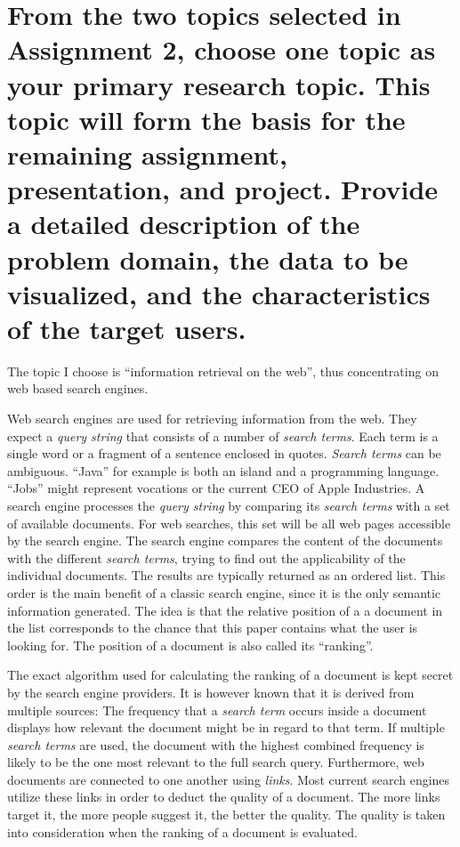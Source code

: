 \section{From the two topics selected in Assignment 2, choose one topic as your primary research topic. This topic will form the basis for the remaining assignment, presentation, and project. Provide a detailed description of the problem domain, the data to be visualized, and the characteristics of the target users.}

The topic I choose is ``information retrieval on the web'', thus concentrating on web based search engines.

Web search engines are used for retrieving information from the web. They expect a \emph{query string} that consists of a number of \emph{search terms}. Each term is a single word or a fragment of a sentence enclosed in quotes. \emph{Search terms} can be ambiguous. ``Java'' for example is both an island and a programming language. ``Jobs'' might represent vocations or the current CEO of Apple Industries. A search engine processes the \emph{query string} by comparing its \emph{search terms} with a set of available documents. For web searches, this set will be all web pages accessible by the search engine. The search engine compares the content of the documents with the different \emph{search terms}, trying to find out the applicability of the individual documents. The results are typically returned as an ordered list. This order is the main benefit of a classic search engine, since it is the only semantic information generated. The idea is that the relative position of a a document in the list corresponds to the chance that this paper contains what the user is looking for. The position of a document is also called its ``ranking''.

The exact algorithm used for calculating the ranking of a document is kept secret by the search engine providers. It is however known that it is derived from multiple sources: The frequency that a \emph{search term} occurs inside a document displays how relevant the document might be in regard to that term. If multiple \emph{search terms} are used, the document with the highest combined frequency is likely to be the one most relevant to the full search query. Furthermore, web documents are connected to one another using \emph{links}. Most current search engines utilize these links in order to deduct the quality of a document. The more links target it, the more people suggest it, the better the quality. The quality is taken into consideration when the ranking of a document is evaluated.

